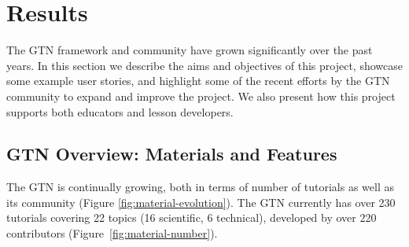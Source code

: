 \documentclass[10pt,letterpaper]{article}
\begin{document}
\section*{Results}

The GTN framework and community have grown significantly over the past years. In this section we describe the aims and objectives of this project, showcase some example user stories, and highlight some of the recent efforts by the GTN community to expand and improve the project. We also present how this project supports both educators and lesson developers.

\subsection*{GTN Overview: Materials and Features}
The GTN is continually growing, both in terms of number of tutorials as well as its community (Figure \ref{fig:material-evolution}). The GTN currently has over 230 tutorials covering 22 topics (16 scientific, 6 technical), developed by over 220 contributors (Figure~\ref{fig:material-number}).
\end{document}

